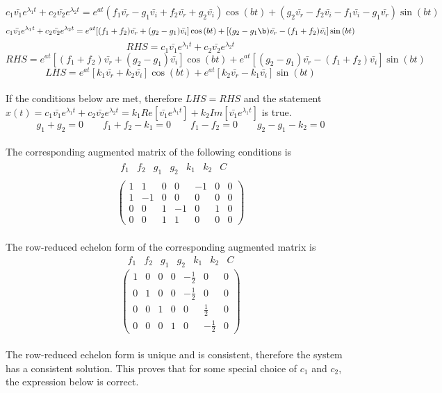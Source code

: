 $$c_1\bar{v_1}e^{\lambda_1 t} + c_2\bar{v_2}e^{\lambda_2 t} = e^{at}(f_1\bar{v_r} - g_1\bar{v_i} + f_2\bar{v_r} + g_2\bar{v_i})\cos{(bt)} + (g_2\bar{v_r} - f_2\bar{v_i}-f_1\bar{v_i} - g_1\bar{v_r})\sin{(bt)} $$
$$c_1\bar{v_1}e^{\lambda_1 t} + c_2\bar{v_2}e^{\lambda_2 t} = e^{at}[(f_1 + f_2)\bar{v_r} +(g_2- g_1)\bar{v_i}]\cos{(bt)} + [(g_2 - g_1\b)\bar{v_r} - (f_1 + f_2)\bar{v_i}]\sin{(bt)} $$
$$RHS = c_1\bar{v_1}e^{\lambda_1 t} + c_2\bar{v_2}e^{\lambda_2 t}$$
$$RHS = e^{at}[(f_1 + f_2)\bar{v_r} +(g_2- g_1)\bar{v_i}]\cos{(bt)} + e^{at}[(g_2 - g_1)\bar{v_r} - (f_1 + f_2)\bar{v_i}]\sin{(bt)}$$
$$LHS = e^{at}[k_1\bar{v_r}+ k_2\bar{v_i}]\cos{(bt)}  + e^{at}[k_2\bar{v_r}- k_1\bar{v_i}]\sin{(bt)}$$
\\If the conditions below are met, therefore $LHS = RHS$ and the statement $\displaystyle{x(t) = c_1\bar{v_1}e^{\lambda_1 t} + c_2\bar{v_2}e^{\lambda_2 t} = k_1Re[\bar{v_1}e^{\lambda_1 t}] + k_2Im[\bar{v_1}e^{\lambda_1 t}]}$ is true. 
$$g_1 + g_2 =0 \qquad f_1 + f_2 - k_1 = 0 \qquad f_1 - f_2 = 0 \qquad g_2 - g_1 - k_2 = 0$$
\\The corresponding augmented matrix of the following conditions is
\begin{equation*}
\begin{split}
\begin{matrix}f_1 & f_2 & g_1 & g_2 & k_1 & k_2 & C \end{matrix} \\ \begin{pmatrix}1 & 1 & 0 &0 &-1 &0 &0 \\1 &-1 &0 &0 &0 &0 &0 \\ 0&0 &1 &-1 &0 &1 &0  \\ 0&0 &1 &1 &0 &0 &0 \end{pmatrix}
\end{split}
\end{equation*}
\\The row-reduced echelon form of the corresponding augmented matrix is
$$\begin{matrix} f_1 & f_2 & g_1 & g_2 & k_1 & k_2 & C \end{matrix}$$
$$\begin{pmatrix}1 &0 &0 &0 &-\frac{1}{2} &0 &0 \\ 0& 1&0 &0 &-\frac{1}{2} &0 &0 \\0 &0 &1 &0 &0 &\frac{1}{2} & 0\\0 &0 &0 &1 &0 &-\frac{1}{2} &0 \end{pmatrix}$$
\\The row-reduced echelon form is unique and is consistent, therefore the system has a consistent solution. This proves that for some special choice of $c_1$ and $c_2$, the expression below is correct.
